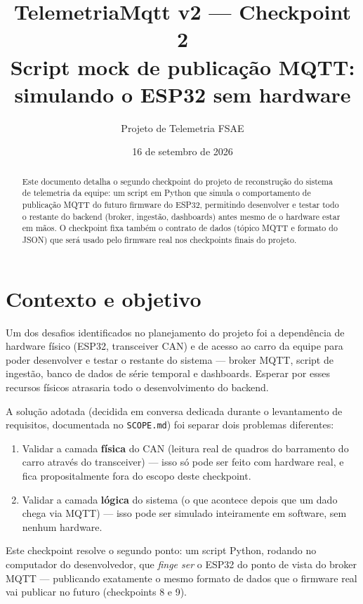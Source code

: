 \documentclass[11pt,a4paper]{article}
\title{\textbf{TelemetriaMqtt v2 --- Checkpoint 2} \\[4pt]
\large Script mock de publicação MQTT: simulando o ESP32 sem hardware}
\author{Projeto de Telemetria FSAE}
\date{16 de setembro de 2026}
\begin{document}
\maketitle

\begin{abstract}
\noindent Este documento detalha o segundo checkpoint do projeto de reconstrução do sistema de telemetria da equipe: um script em Python que simula o comportamento de publicação MQTT do futuro firmware do ESP32, permitindo desenvolver e testar todo o restante do backend (broker, ingestão, dashboards) antes mesmo de o hardware estar em mãos. O checkpoint fixa também o contrato de dados (tópico MQTT e formato do JSON) que será usado pelo firmware real nos checkpoints finais do projeto.
\end{abstract}

\tableofcontents

\section{Contexto e objetivo}

Um dos desafios identificados no planejamento do projeto foi a dependência de hardware físico (ESP32, transceiver CAN) e de acesso ao carro da equipe para poder desenvolver e testar o restante do sistema --- broker MQTT, script de ingestão, banco de dados de série temporal e dashboards. Esperar por esses recursos físicos atrasaria todo o desenvolvimento do backend.

A solução adotada (decidida em conversa dedicada durante o levantamento de requisitos, documentada no \texttt{SCOPE.md}) foi separar dois problemas diferentes:

\begin{enumerate}
    \item Validar a camada \textbf{física} do CAN (leitura real de quadros do barramento do carro através do transceiver) --- isso só pode ser feito com hardware real, e fica propositalmente fora do escopo deste checkpoint.
    \item Validar a camada \textbf{lógica} do sistema (o que acontece depois que um dado chega via MQTT) --- isso pode ser simulado inteiramente em software, sem nenhum hardware.
\end{enumerate}

Este checkpoint resolve o segundo ponto: um script Python, rodando no computador do desenvolvedor, que \textit{finge ser} o ESP32 do ponto de vista do broker MQTT --- publicando exatamente o mesmo formato de dados que o firmware real vai publicar no futuro (checkpoints 8 e 9).
\end{document}
